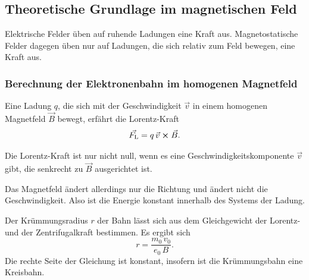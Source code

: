 \subsection{Theoretische Grundlage im magnetischen Feld}
Elektrische Felder üben auf ruhende Ladungen 
eine Kraft aus. Magnetostatische Felder dagegen üben nur auf 
Ladungen, die sich relativ zum Feld bewegen, eine Kraft aus.

\subsubsection{Berechnung der Elektronenbahn im homogenen Magnetfeld}
Eine Ladung $q$, die sich mit der Geschwindigkeit $\vec{v}$ in 
einem homogenen Magnetfeld $\vec{B}$ bewegt, erfährt die Lorentz-Kraft 
\begin{equation}
    \vec{F_\text{L}}= q \, \vec{v} \cross \vec{B}.
    \label{eqn:Lorentz}
\end{equation}

\noindent Die Lorentz-Kraft ist nur nicht null, wenn es eine 
Geschwindigkeitskomponente $\vec{v}$ gibt, die senkrecht zu 
$\vec{B}$ ausgerichtet ist. 

\noindent Das  Magnetfeld ändert allerdings nur die Richtung und ändert 
nicht die Geschwindigkeit. Also ist die Energie konstant 
innerhalb des Systems der Ladung.

\noindent Der Krümmungsradius $r$ der Bahn lässt sich aus dem Gleichgewicht der 
Lorentz- und der Zentrifugalkraft bestimmen. Es ergibt sich 
\begin{equation}
    r= \frac{m_\text{0} \, v_\text{0}}{e_\text{0} \, B}.
    \label{eqn:radius}
\end{equation}
Die rechte Seite der Gleichung ist konstant, insofern ist die 
Krümmungsbahn eine Kreisbahn. 

